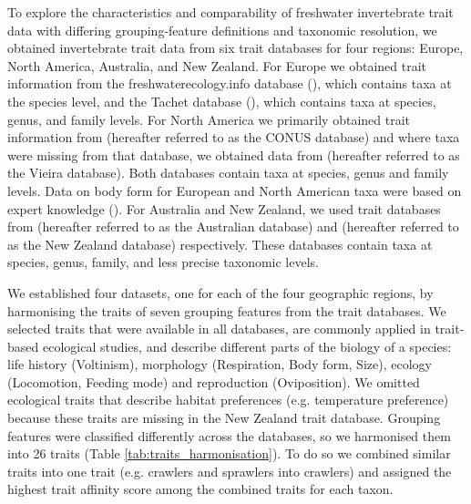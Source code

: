 \documentclass{article}
\begin{document}
To explore the characteristics and comparability of freshwater invertebrate trait data with differing grouping-feature definitions and taxonomic resolution, we obtained invertebrate trait data from six trait databases for four regions: Europe, North America, Australia, and New Zealand. For Europe we obtained trait information from the freshwaterecology.info database (\cite{schmidt-kloiber_www.freshwaterecology.info_2015}), which contains taxa at the species level, and the Tachet database (\cite{ussegliopolatera_biological_2000}), which contains taxa at species, genus, and family levels. For North America we primarily obtained trait information from \citet{twardochleb_freshwater_nodate} (hereafter referred to as the CONUS database) and where taxa were missing from that database, we obtained data from \citet{vieira_database_nodate} (hereafter referred to as the Vieira database). Both databases contain taxa at species, genus and family levels. Data on body form for European and North American taxa were based on expert knowledge (\cite{polatera_personal_information_2020}). For Australia and New Zealand, we used trait databases from \citet{kefford_integrated_2020} (hereafter referred to as the Australian database) and \citet{Philips_and_Smith_NZ_DB_2018} (hereafter referred to as the New Zealand database) respectively. These databases contain taxa at species, genus, family, and less precise taxonomic levels.

We established four datasets, one for each of the four geographic regions, by harmonising the traits of seven grouping features from the trait databases. We selected traits that were available in all databases, are commonly applied in trait-based ecological studies, and describe different parts of the biology of a species: life history (Voltinism), morphology (Respiration, Body form, Size), ecology (Locomotion, Feeding mode) and reproduction (Oviposition). We omitted ecological traits that describe habitat preferences (e.g. temperature preference) because these traits are missing in the New Zealand trait database. Grouping features were  classified differently across the databases, so we harmonised them into 26 traits (Table \ref{tab:traits_harmonisation}). To do so we combined  similar traits into one trait (e.g. crawlers and sprawlers into crawlers) and assigned the highest trait affinity score among the combined traits for each taxon.  
\end{document}
